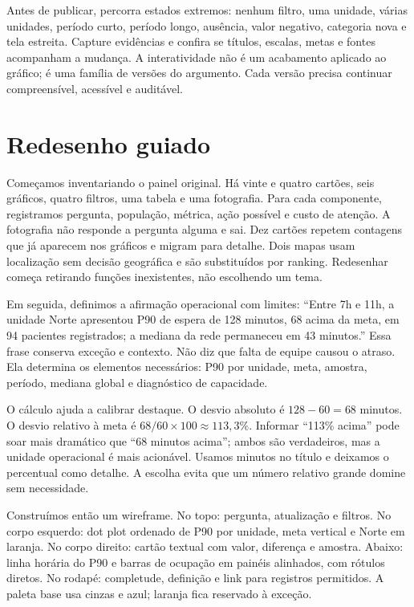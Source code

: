 Antes de publicar, percorra estados extremos: nenhum filtro, uma unidade, várias unidades, período curto, período longo, ausência, valor negativo, categoria nova e tela estreita. Capture evidências e confira se títulos, escalas, metas e fontes acompanham a mudança. A interatividade não é um acabamento aplicado ao gráfico; é uma família de versões do argumento. Cada versão precisa continuar compreensível, acessível e auditável.

\section{Redesenho guiado}

Começamos inventariando o painel original. Há vinte e quatro cartões, seis gráficos, quatro filtros, uma tabela e uma fotografia. Para cada componente, registramos pergunta, população, métrica, ação possível e custo de atenção. A fotografia não responde a pergunta alguma e sai. Dez cartões repetem contagens que já aparecem nos gráficos e migram para detalhe. Dois mapas usam localização sem decisão geográfica e são substituídos por ranking. Redesenhar começa retirando funções inexistentes, não escolhendo um tema.

Em seguida, definimos a afirmação operacional com limites: ``Entre 7h e 11h, a unidade Norte apresentou P90 de espera de 128 minutos, 68 acima da meta, em 94 pacientes registrados; a mediana da rede permaneceu em 43 minutos.'' Essa frase conserva exceção e contexto. Não diz que falta de equipe causou o atraso. Ela determina os elementos necessários: P90 por unidade, meta, amostra, período, mediana global e diagnóstico de capacidade.

O cálculo ajuda a calibrar destaque. O desvio absoluto é $128-60=68$ minutos. O desvio relativo à meta é $68/60\times100\approx113{,}3\%$. Informar ``113\% acima'' pode soar mais dramático que ``68 minutos acima''; ambos são verdadeiros, mas a unidade operacional é mais acionável. Usamos minutos no título e deixamos o percentual como detalhe. A escolha evita que um número relativo grande domine sem necessidade.

Construímos então um wireframe. No topo: pergunta, atualização e filtros. No corpo esquerdo: dot plot ordenado de P90 por unidade, meta vertical e Norte em laranja. No corpo direito: cartão textual com valor, diferença e amostra. Abaixo: linha horária do P90 e barras de ocupação em painéis alinhados, com rótulos diretos. No rodapé: completude, definição e link para registros permitidos. A paleta base usa cinzas e azul; laranja fica reservado à exceção.

